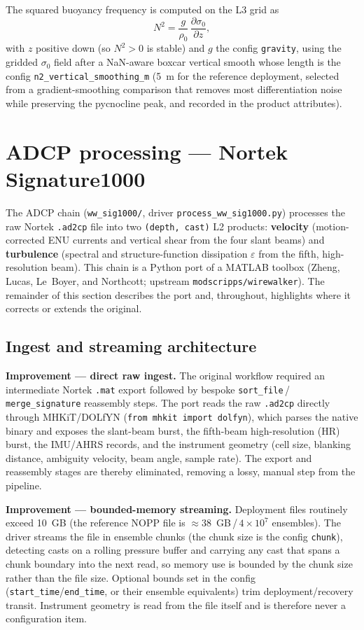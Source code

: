 \documentclass[11pt]{article}
\newcommand{\code}[1]{\texttt{#1}}
\newcommand{\eps}{\varepsilon}
\begin{document}
The squared buoyancy frequency is computed on the L3 grid as
\begin{equation}
N^{2} = \frac{g}{\rho_0}\,\frac{\partial \sigma_0}{\partial z},
\end{equation}
with $z$ positive down (so $N^2 > 0$ is stable) and $g$ the config \code{gravity}, using the
gridded $\sigma_0$ field after a NaN-aware boxcar vertical smooth whose length is the config
\code{n2\_vertical\_smoothing\_m} (5~m for the reference deployment, selected from a
gradient-smoothing comparison that removes most differentiation noise while preserving the
pycnocline peak, and recorded in the product attributes).

\section{ADCP processing --- Nortek Signature1000}

The ADCP chain (\code{ww\_sig1000/}, driver \code{process\_ww\_sig1000.py}) processes the raw
Nortek \code{.ad2cp} file into two \code{(depth, cast)} L2 products: \textbf{velocity}
(motion-corrected ENU currents and vertical shear from the four slant beams) and
\textbf{turbulence} (spectral and structure-function dissipation $\eps$ from the fifth,
high-resolution beam). This chain is a Python port of a MATLAB toolbox (Zheng, Lucas,
Le~Boyer, and Northcott; upstream \code{modscripps/wirewalker}). The remainder of this section
describes the port and, throughout, highlights where it corrects or extends the original.

\subsection{Ingest and streaming architecture}

\textbf{Improvement --- direct raw ingest.} The original workflow required an intermediate
Nortek \code{.mat} export followed by bespoke \code{sort\_file}\,/\,\code{merge\_signature}
reassembly steps. The port reads the raw \code{.ad2cp} directly through MHKiT/DOLfYN
(\code{from mhkit import dolfyn}), which parses the native binary and exposes the slant-beam
burst, the fifth-beam high-resolution (HR) burst, the IMU/AHRS records, and the instrument
geometry (cell size, blanking distance, ambiguity velocity, beam angle, sample rate). The
export and reassembly stages are thereby eliminated, removing a lossy, manual step from the
pipeline.

\textbf{Improvement --- bounded-memory streaming.} Deployment files routinely exceed 10~GB
(the reference NOPP file is $\approx 38$~GB\,/\,$4\times10^{7}$ ensembles). The driver streams
the file in ensemble chunks (the chunk size is the config \code{chunk}), detecting casts on a
rolling pressure buffer and carrying any cast that spans a chunk boundary into the next read,
so memory use is bounded by the chunk size rather than the file size. Optional bounds set in
the config (\code{start\_time}/\code{end\_time}, or their ensemble equivalents) trim
deployment/recovery transit. Instrument geometry is read from the file itself and is therefore
never a configuration item.
\end{document}
